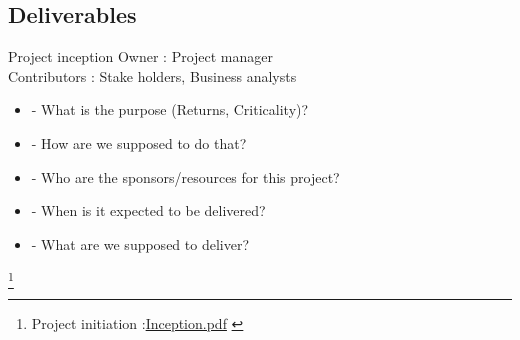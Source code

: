 \documentclass[8pt]{beamer}
\begin{document}



\subsection{Deliverables}

\begin{frame}{Project inception}
Owner : Project manager\\
Contributors : Stake holders, Business analysts\\
 \begin{itemize}
  \item
- What is the purpose (Returns, Criticality)?
  \item
- How are we supposed to do that? 
  \item
- Who are the sponsors/resources for this project?
  \item
- When is it expected to be delivered?
  \item
- What are we supposed to deliver?
 \end{itemize}
\footnote{
\footnotesize{
\tiny{Project initiation :\url{Inception.pdf} }}
}
\end{frame}
\end{document}
